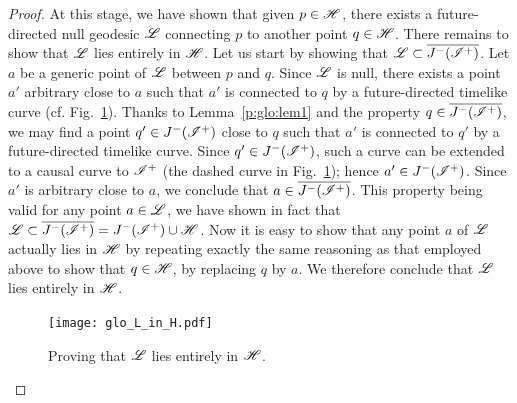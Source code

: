 \begin{proof}
At this stage, we have shown that given $p\in\mathscr{H}$, there exists
a future-directed null geodesic $\mathscr{L}$ connecting $p$ to another point $q\in\mathscr{H}$.
There remains to show that $\mathscr{L}$ lies entirely in $\mathscr{H}$.
Let us start by showing that $\mathscr{L}\subset \overline{J^-(\mathscr{I}^+)}$.
Let $a$ be a generic point of $\mathscr{L}$ between $p$ and $q$. Since $\mathscr{L}$ is
null, there exists a point
$a'$ arbitrary close to $a$ such that $a'$ is connected to $q$ by a
future-directed timelike curve (cf. Fig.~\ref{f:glo:L_in_H}). Thanks to Lemma~\ref{p:glo:lem1}
and the property $q\in \overline{J^-(\mathscr{I}^+)}$, we may
find a point $q'\in J^-(\mathscr{I}^+)$ close to $q$ such that $a'$ is connected
to $q'$ by a future-directed timelike curve.
Since $q'\in J^-(\mathscr{I}^+)$, such a curve can be extended
to a causal curve to $\mathscr{I}^+$  (the dashed curve
in Fig.~\ref{f:glo:L_in_H}); hence
$a'\in  J^-(\mathscr{I}^+)$. Since $a'$ is arbitrary close to $a$, we conclude
that $a\in\overline{J^-(\mathscr{I}^+)}$.
This property being valid for any point $a\in \mathscr{L}$, we have
shown in fact that $\mathscr{L}\subset \overline{J^-(\mathscr{I}^+)} = J^-(\mathscr{I}^+)\cup \mathscr{H}$.
Now it is easy to show that any point $a$ of $\mathscr{L}$ actually lies in $\mathscr{H}$
by repeating exactly the same reasoning as that employed above to show that
$q\in\mathscr{H}$, by replacing $q$ by $a$. We therefore conclude that
$\mathscr{L}$ lies entirely in $\mathscr{H}$.

\begin{figure}
\centerline{\texttt{[image: glo\_L\_in\_H.pdf]}}
\caption[]{\label{f:glo:L_in_H} \footnotesize
Proving that $\mathscr{L}$ lies entirely in $\mathscr{H}$.}
\end{figure}




\end{proof}
